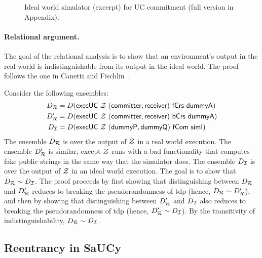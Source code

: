 \begin{figure}

\caption{Ideal world simulator (excerpt) for UC commitment (full version in Appendix).}
\label{fig:sim-short}
\end{figure}


\paragraph{Relational argument.}
The goal of the relational analysis is to show that an environment's output in
the real world is indistinguishable from its output in the ideal world. The
proof follows the one in Canetti and Fischlin~\cite{canetti2001commitments}.

\begin{sketch}
  Consider the following ensembles:
  \begin{align*}
    D_{\mathcal{{R}}} &= D(\mathsf{execUC~\mathcal{{Z}}~(committer, receiver)~fCrs~dummyA})\\
    D_{\mathcal{{R}}}' &= D(\mathsf{execUC~\mathcal{{Z}}~(committer, receiver)~bCrs~dummyA})\\
    D_{\mathcal{{I}}} &= D(\mathsf{execUC~\mathcal{{Z}}~(dummyP, dummyQ)~fCom~simI})
  \end{align*}
  \noindent The ensemble $D_{\mathcal{{R}}}$ is over the output of $\mathcal{{Z}}$ in a real
  world execution. The ensemble $D_{\mathcal{{R}}}'$ is similar, except $\mathcal{{Z}}$ runs
  with a bad functionality that computes fake public strings in the same way
  that the simulator does. The ensemble $D_{\mathcal{{I}}}$ is over the output of
  $\mathcal{{Z}}$ in an ideal world execution. The goal is to show that $D_{\mathcal{{R}}} \sim
  D_{\mathcal{{I}}}$.
%  
  The proof proceeds by first showing that distinguishing between $D_{\mathcal{{R}}}$
  and $D_{\mathcal{{R}}}'$ reduces to breaking the pseudorandomness of \textsf{tdp}
  (hence, $D_{\mathcal{{R}}} \sim D_{\mathcal{{R}}}'$), and then by showing that distinguishing
  between $D_{\mathcal{{R}}}'$ and $D_{\mathcal{{I}}}$ also reduces to breaking the
  pseudorandomness of \textsf{tdp} (hence, $D_{\mathcal{{R}}}' \sim D_{\mathcal{{I}}}$). By the
  transitivity of indistinguishability, ${D_{\mathcal{{R}}} \sim D_{\mathcal{{I}}}}$.
\end{sketch}

\subsection{Reentrancy in SaUCy}
\label{subsec:reentrancy}

